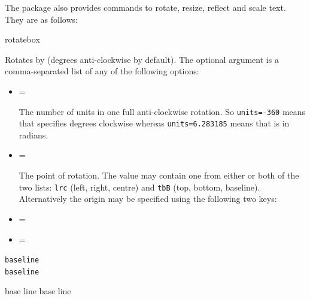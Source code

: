 The  package also provides commands to rotate, resize, 
reflect and scale text.  They are as follows:
\begin{definition}
\gls{rotatebox}
\end{definition}
Rotates  by  (degrees anti-clockwise by
default). The optional argument  is a
comma-separated list of any of the following options:

\begin{itemize}
  \item {}=

    The number of units in one full anti-clockwise rotation. So
    \texttt{units=-360} means that  specifies degrees
    clockwise whereas \texttt{units=6.283185} means that
     is in radians.

  \item {}=

    The point of rotation.
    The value  may contain one from either or both of
    the two lists: \texttt{lrc} (left, right, centre) and \texttt{tbB}
    (top, bottom, baseline). Alternatively the origin may be
    specified using the following two keys:

  \item {}=

  \item {}=
\end{itemize}

\begin{code}
\begin{alltt}
base line
base line
\end{alltt}
\end{code}\screenpagebreak
\begin{result}
base line
base line
\end{result}

